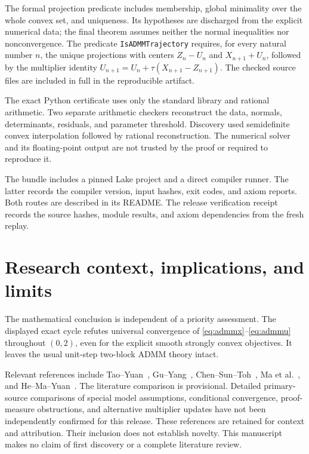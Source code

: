 \documentclass[11pt,a4paper]{article}
\theoremstyle{remark}
\begin{document}
The formal projection predicate includes membership, global minimality over the whole convex set, and uniqueness. Its hypotheses are discharged from the explicit numerical data; the final theorem assumes neither the normal inequalities nor nonconvergence. The predicate \texttt{IsADMMTrajectory} requires, for every natural number $n$, the unique projections with centers $Z_n-U_n$ and $X_{n+1}+U_n$, followed by the multiplier identity $U_{n+1}=U_n+\tau(X_{n+1}-Z_{n+1})$. The checked source files are included in full in the reproducible artifact.



The exact Python certificate uses only the standard library and rational arithmetic. Two separate arithmetic checkers reconstruct the data, normals, determinants, residuals, and parameter threshold. Discovery used semidefinite convex interpolation followed by rational reconstruction. The numerical solver and its floating-point output are not trusted by the proof or required to reproduce it.

The bundle includes a pinned Lake project and a direct compiler runner. The latter records the compiler version, input hashes, exit codes, and axiom reports. Both routes are described in its README. The release verification receipt records the source hashes, module results, and axiom dependencies from the fresh replay.

\section{Research context, implications, and limits}
The mathematical conclusion is independent of a priority assessment.
The displayed exact cycle refutes universal convergence of
\eqref{eq:admmx}--\eqref{eq:admmu} throughout $(0,2)$, even for the
explicit smooth strongly convex objectives. It leaves the usual unit-step
two-block ADMM theory intact.

Relevant references include Tao--Yuan~\cite{TaoYuan},
Gu--Yang~\cite{GuYang}, Chen--Sun--Toh~\cite{ChenSunToh},
Ma et al.~\cite{MaEtAl}, and He--Ma--Yuan~\cite{HeMaYuan}.
The literature comparison is provisional. Detailed primary-source comparisons
of special model assumptions, conditional convergence, proof-measure
obstructions, and alternative multiplier updates have not been independently
confirmed for this release. These references are retained for context and
attribution. Their inclusion does not establish novelty. This manuscript
makes no claim of first discovery or a complete literature review.
\end{document}
